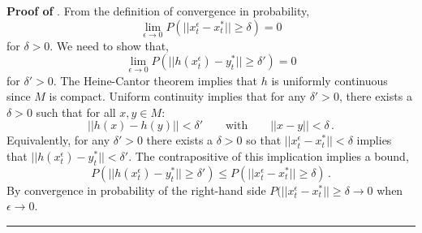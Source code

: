 \documentclass[12pt]{article}
\newcommand{\BlackBox}{\rule{1.5ex}{1.5ex}}  %
\begin{document}
\vspace{0.5em}
\noindent
{\bf Proof of }.
    From the definition of convergence in probability, 
    \begin{equation*}
        \lim_{\epsilon \rightarrow 0}P(||x^{\epsilon}_t - x^*_t || \geq \delta) = 0
    \end{equation*}
    for $\delta >0$. We need to show that,
    \begin{equation*}
        \lim_{\epsilon \rightarrow 0}P(|| h(x^{\epsilon}_t) - y^*_t || \geq \delta') = 0
    \end{equation*}
    for $\delta' >0$. The Heine-Cantor theorem implies that $h$ is uniformly continuous since $M$ is compact. Uniform continuity implies that for any $\delta' > 0 $, there exists a $\delta > 0 $ such that for all $x,y \in M$:
    \begin{equation*}
        ||h(x) - h(y)|| < \delta' \qquad \text{with} \qquad ||x-y|| < \delta \,.
    \end{equation*} 
    Equivalently, for any $\delta'>0$ there exists a $\delta > 0$ so that $||x^{\epsilon}_t - x^*_t || < \delta$ implies that $|| h(x^{\epsilon}_t) - y^*_t || < \delta'$. The contrapositive of this implication implies a bound,
    \begin{equation*}
        P(|| h(x^{\epsilon}_t) - y^*_t || \geq \delta') \leq P(|| x^{\epsilon}_t - x^*_t || \geq \delta) \,.
    \end{equation*}     
    By convergence in probability of the right-hand side $P(|| x^{\epsilon}_t - x^*_t || \geq \delta \rightarrow 0$ when $\epsilon \rightarrow 0$.
\hfill\BlackBox
\end{document}
